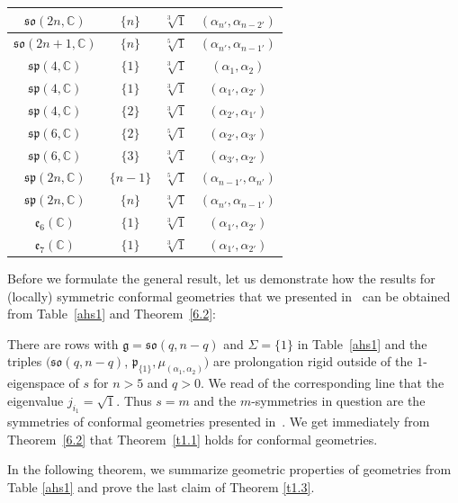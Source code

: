 \documentclass[pdftex]{sigma}
\newcommand{\fg}{\mathfrak g}
\newcommand{\fp}{\mathfrak p}
\numberwithin{equation}{section}
\begin{document}
\begin{table}[th!]
\begin{tabular}{|c|c|c|c|}
$\mathfrak{so}(2n,\mathbb{C})$ & $\{n\}$& $\sqrt[3]{1}$& $(\alpha_{n'},\alpha_{n-2'})$ \\
\hline
$\mathfrak{so}(2n+1,\mathbb{C})$ & $\{n\}$& $\sqrt[5]{1}$& $(\alpha_{n'},\alpha_{n-1'})$ \\
\hline
$\mathfrak{sp}(4,\mathbb{C})$ & $\{1\}$&$\sqrt[3]{1}$& $(\alpha_{1},\alpha_{2})$\\
\hline
$\mathfrak{sp}(4,\mathbb{C})$ & $\{1\}$&$\sqrt[3]{1}$& $(\alpha_{1'},\alpha_{2'})$\\
\hline
$\mathfrak{sp}(4,\mathbb{C})$ & $\{2\}$&$\sqrt[3]{1}$& $(\alpha_{2'},\alpha_{1'})$\\
\hline
$\mathfrak{sp}(6,\mathbb{C})$ & $\{2\}$&$\sqrt[5]{1}$& $(\alpha_{2'},\alpha_{3'})$\\
\hline
$\mathfrak{sp}(6,\mathbb{C})$ & $\{3\}$&$\sqrt[3]{1}$& $(\alpha_{3'},\alpha_{2'})$\\
\hline
$\mathfrak{sp}(2n,\mathbb{C})$ & $\{n-1\}$&$\sqrt[5]{1}$& $(\alpha_{n-1'},\alpha_{n'})$\\
\hline
$\mathfrak{sp}(2n,\mathbb{C})$ & $\{n\}$&$\sqrt[3]{1}$& $(\alpha_{n'},\alpha_{n-1'})$\\
\hline
$\mathfrak{e}_{6}(\mathbb{C})$ & $\{1\}$&$\sqrt[3]{1}$&$(\alpha_{1'},\alpha_{2'})$\\
\hline
$\mathfrak{e}_{7}(\mathbb{C})$ & $\{1\}$&$\sqrt[3]{1}$&$(\alpha_{1'},\alpha_{2'})$\\
\hline
\end{tabular}
\end{table}

\begin{Example}
Before we formulate the general result, let us demonstrate how the results for (locally) symmetric conformal geometries that we presented in~\cite{GZ4} can be obtained from Table~\ref{ahs1} and Theorem~\ref{6.2}:

There are rows with $\fg=\mathfrak{so}(q,n-q)$ and $\Sigma=\{1\}$ in Table~\ref{ahs1} and the triples $(\mathfrak{so}(q,n-q)$, $\fp_{\{1\}},\mu_{(\alpha_1,\alpha_2)})$ are prolongation rigid outside of the $1$-eigenspace of $s$ for $n>5$ and $q>0$. We read of the corresponding line that the eigenvalue $j_{i_1}=\sqrt{1}$. Thus $s=m$ and the $m$-symmetries in question are the symmetries of conformal geometries presented in~\cite{GZ4}. We get immediately from Theorem~\ref{6.2} that Theorem~\ref{t1.1} holds for conformal geometries.
\end{Example}

In the following theorem, we summarize geometric properties of geometries from Table \ref{ahs1} and prove the last claim of Theorem \ref{t1.3}.
\end{document}
